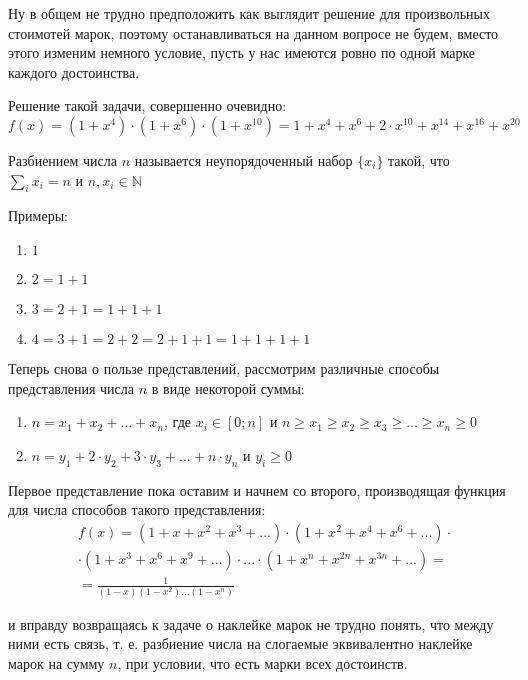 Ну в общем не трудно предположить как выглядит решение для произвольных стоимотей марок, поэтому останавливаться на данном вопросе не будем, вместо этого изменим немного условие, пусть у нас имеются ровно по одной марке каждого достоинства.

Решение такой задачи, совершенно очевидно:
\[
	f\left(x\right) = \left(1+x^4\right)\cdot\left(1+x^6\right)\cdot\left(1+x^{10}\right) = 1+x^4+x^6+2\cdot x^{10} + x^{14} + x^{16} + x^{20}
\]

\begin{Def}
Разбиением числа $n$ называется неупорядоченный набор $\{x_i\}$ такой, что $\sum_i x_i = n$ и $n,x_i \in \mathbb{N}$
\end{Def}

Примеры:
\begin{enumerate}
\item $1$

\item $2 = 1+1$

\item $3 = 2+1 = 1+1+1$

\item $4 = 3+1 = 2+2 = 2+1+1 = 1+1+1+1$
\end{enumerate}

Теперь снова о пользе представлений, рассмотрим различные способы представления числа $n$ в виде некоторой суммы:
\begin{enumerate}
\item $n = x_1 + x_2 + ... + x_n$, где $x_i \in \left[0;n\right]$ и $n \ge x_1 \ge x_2 \ge x_3 \ge ... \ge x_n \ge 0$

\item $n = y_1 + 2\cdot y_2 + 3 \cdot y_3 + ... + n \cdot y_n$ и $y_i \ge 0$
\end{enumerate}

Первое представление пока оставим и начнем со второго, производящая функция для числа способов такого представления:
\[
	\begin{split}
		&f\left(x\right) = \left(1+x+x^2+x^3+...\right)\cdot\left(1+x^2+x^4+x^6+...\right)\cdot\\
		&\cdot\left(1+x^3+x^6+x^9+...\right)\cdot ... \cdot\left(1+x^n+x^{2n}+x^{3n}+...\right) = \\
		& = \frac{1}{\left(1-x\right)\left(1-x^2\right)...\left(1-x^n\right)}
	\end{split}
\]

и вправду возвращаясь к задаче о наклейке марок не трудно понять, что между ними есть связь, т. е. разбиение числа на слогаемые эквивалентно наклейке марок на сумму $n$, при условии, что есть марки всех достоинств.


